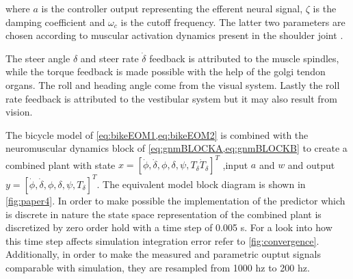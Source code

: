 where \ensuremath{a} is the controller output representing the efferent neural signal, \ensuremath{\zeta} is the damping coefficient and \ensuremath{\omega_c} is the cutoff frequency. The latter two   parameters are chosen according to muscular activation dynamics present in the shoulder joint \cite{happee2008posture}.

The steer angle \(\delta\) and steer rate \(\dot{\delta}\) feedback is attributed to the muscle spindles, while the torque feedback is made possible with the help of the golgi tendon organs. The roll and heading angle come from the visual system. Lastly the roll rate feedback is attributed to the vestibular system but it may also result from vision. 

The bicycle model of \cref{eq:bikeEOM1,eq:bikeEOM2} is combined with the neuromuscular dynamics block of \cref{eq:gnmBLOCKA,eq:gnmBLOCKB} to create a combined  plant with state \ensuremath{x=[\dot{\phi}, \dot{\delta}, \phi, \delta, \psi, T_\delta \dot{T}_\delta]^{T}} ,input \ensuremath{a} and \ensuremath{w} and output \ensuremath{y=[\dot{\phi}, \dot{\delta}, \phi, \delta, \psi, T_\delta]^{T}}. The equivalent model block diagram is shown in \cref{fig:paper4}. In order to make possible the implementation of the predictor which is discrete in nature the state space representation of the combined plant is discretized by zero order hold with a time step of 0.005 \si{\second}. For a look into how this time step affects simulation integration error refer to \cref{fig:convergence}. Additionally, in order to make the measured  and parametric ouptut signals comparable with simulation, they are resampled from 1000 \si{hz} to 200 \si{hz}. 

